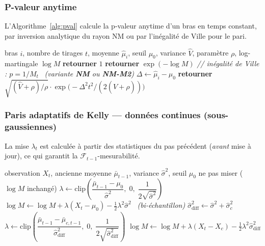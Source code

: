 \documentclass[10.5pt,a4paper]{article}
\newcommand{\calO}{\mathcal{O}}
\begin{document}
\subsubsection{P-valeur anytime}

L'Algorithme~\ref{alg:pval} calcule la p-valeur anytime d'un bras en temps constant,
par inversion analytique du rayon NM ou par l'in\'egalit\'e de Ville pour le pari.

\begin{algorithm}[H]
\caption{P-valeur anytime --- $\calO(1)$, mono et bi-\'echantillon}
\label{alg:pval}
\begin{algorithmic}[1]
\Require bras $i$, nombre de tirages $t$, moyenne $\hat{\mu}_i$, seuil $\mu_0$,
         variance $\hat{V}$, param\`etre $\rho$, log-martingale $\log M$
  \State \textbf{retourner} $1$
\EndIf
{}
  \State \textbf{retourner} $\exp(-\log M)$ \hfill\textit{// in\'egalit\'e de Ville : $p = 1/M_t$}
\Else\ \textit{(variante \textbf{NM} ou \textbf{NM-M2})}
  \State $\Delta \leftarrow \hat{\mu}_i - \mu_0$
  \State \textbf{retourner} $\sqrt{(\hat{V}+\rho)/\rho}\cdot\exp\!\bigl(-\Delta^2 t^2 / (2(\hat{V}+\rho))\bigr)$
\EndIf
\end{algorithmic}
\end{algorithm}

\subsubsection{Paris adaptatifs de Kelly --- donn\'ees continues (sous-gaussiennes)}

La mise $\lambda_t$ est calcul\'ee \`a partir des statistiques du pas pr\'ec\'edent
(\emph{avant} mise \`a jour), ce qui garantit la $\mathcal{F}_{t-1}$-mesurabilit\'e.

\begin{algorithm}[H]
\caption{Pari de Kelly --- donn\'ees continues (sous-gaussiennes)}
\label{alg:kelly_cont}
\begin{algorithmic}[1]
\Require observation $X_t$, ancienne moyenne $\bar{\mu}_{t-1}$, variance $\hat{\sigma}^2$,
         seuil $\mu_0$ 
  \State ne pas miser \quad ($\log M$ inchang\'e)
\Else
    \State $\lambda \leftarrow \mathrm{clip}\!\left(\dfrac{\bar{\mu}_{t-1}-\mu_0}{\hat{\sigma}^2},\;0,\;\dfrac{1}{2\sqrt{\hat{\sigma}^2}}\right)$
    \State $\log M \leftarrow \log M + \lambda(X_t - \mu_0) - \tfrac{1}{2}\lambda^2\hat{\sigma}^2$
  \Else\ \textit{(bi-\'echantillon)}
    \State $\hat{\sigma}^2_{\mathrm{diff}} \leftarrow \hat{\sigma}^2 + \hat{\sigma}_c^2$
    \State $\lambda \leftarrow \mathrm{clip}\!\left(\dfrac{\bar{\mu}_{t-1}-\bar{\mu}_{c,t-1}}{\hat{\sigma}^2_{\mathrm{diff}}},\;0,\;\dfrac{1}{2\sqrt{\hat{\sigma}^2_{\mathrm{diff}}}}\right)$
    \State $\log M \leftarrow \log M + \lambda(X_t - X_c) - \tfrac{1}{2}\lambda^2\hat{\sigma}^2_{\mathrm{diff}}$
  \EndIf
\EndIf
\end{algorithmic}
\end{algorithm}
\end{document}
